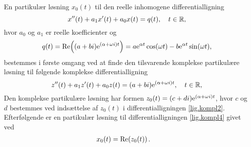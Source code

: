 \begin{method} \label{met.kompl}
En partikulær løsning $ x_0(t) $ til den reelle inhomogene differentialligning
\begin{equation}
x''(t) + a_1x'(t) + a_0x(t) = q(t), \quad t \in \mathbb{R}, \label{lig.kompl4}
\end{equation}
hvor $ a_0 $ og $ a_1 $ er reelle koefficienter og
\begin{equation}
q(t) = \mathrm{Re} \! \left((a+bi) \mathrm{e}^{(\alpha + \omega i)t}\right) = a \mathrm{e}^{\alpha t}\cos(\omega t) - b \mathrm{e}^{\alpha t} \sin(\omega t),
\end{equation}
bestemmes i første omgang ved at finde den tilsvarende komplekse partikulære løsning til følgende komplekse differentialligning
\begin{equation} \label{lig.kompl2}
z''(t) + a_1z'(t) + a_0z(t) = (a+bi) \mathrm{e}^{(\alpha + \omega i)t}, \quad t \in \mathbb{R},
\end{equation}
Den komplekse partikulære løsning har formen $ z_{0}(t) = (c+di) \mathrm{e}^{(\alpha + \omega i)t} $, hvor $ c $ og $ d $ bestemmes ved indsættelse af $ z_{0}(t) $ i differentialligningen \eqref{lig.kompl2}. \bs
Efterfølgende er en partikulær løsning til differentialligningen \eqref{lig.kompl4} givet ved
\begin{equation}
\begin{aligned}
x_0(t) &= \mathrm{Re} \! \left(z_{0}(t)\right).
\end{aligned}
\end{equation}
\end{method}

